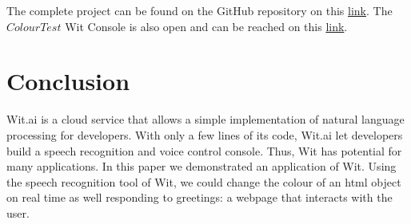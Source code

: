 \documentclass[twoside,11pt]{article}
\begin{document}
The complete project can be found on the GitHub repository on this \href{https://github.com/andreeds/cs807-research-tasks/tree/master/B\%20-\%20The\%20Platform/Wit}{link}.
The $ColourTest$ Wit Console is also open and can be reached on this \href{https://wit.ai/andreeds/ColourTest}{link}.


\section{Conclusion}
\label{sec:conc}

Wit.ai is a cloud service that allows a simple implementation of natural language processing for developers.
With only a few lines of its code, Wit.ai let developers build a speech recognition and voice control console.
Thus, Wit has potential for many applications.
In this paper we demonstrated an application of Wit.
Using the speech recognition tool of Wit, we could change the colour of an html object on real time as well responding to greetings: a webpage that interacts with the user.






\vskip 0.2in

\end{document}
